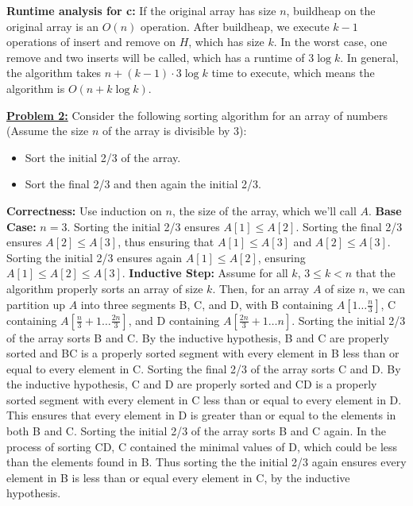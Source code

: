 \documentclass[11pt]{article}
\begin{document}
\begin{flushleft}
		\textbf{Runtime analysis for c:} If the original array has size $n$, buildheap on the original array is an $O(n)$ operation. After buildheap, we execute $k - 1$ operations of insert and remove on $H$, which has size $k$. In the worst case, one remove and two inserts will be called, which has a runtime of $3 \log k$. In general, the algorithm takes $n + (k - 1) \cdot 3 \log k$ time to execute, which means the algorithm is $O(n + k \log k)$.
		\newline
		\item \textbf {\underline{Problem 2:}} Consider the following sorting algorithm for an array of numbers (Assume the size $n$ of the array is divisible by 3):
		\begin{itemize}
			\item   Sort the initial 2/3 of the array.
			\item   Sort the final 2/3 and then again the initial 2/3.
		\end{itemize}
		\textbf{Correctness:} Use induction on $n$, the size of the array, which we'll call $A$. 
		\newline
		\textbf{Base Case:} $n = 3$. Sorting the initial 2/3 ensures $A[1] \leq A[2]$. Sorting the final 2/3 ensures $A[2] \leq A[3]$, thus ensuring that $A[1] \leq A[3]$ and $A[2] \leq A[3]$. Sorting the initial 2/3 ensures again $A[1] \leq A[2]$, ensuring $A[1] \leq A[2] \leq A[3]$.  
		\newline
		\textbf{Inductive Step:} Assume for all $k$, $3 \leq k < n$ that the algorithm properly sorts an array of size $k$. Then, for an array $A$ of size $n$, we can partition up $A$ into three segments B, C, and D, with B containing 
		$A[1 \dots \frac{n}{3}]$, C containing $A[\frac{n}{3} + 1 \dots \frac{2n}{3}]$, and D containing $A[\frac{2n}{3} + 1 \dots n]$. 
		\newline
		Sorting the initial 2/3 of the array sorts B and C. By the inductive hypothesis, B and C are properly sorted and BC is a properly sorted segment with every element in B less than or equal to every element in C.
		\newline
		Sorting the final 2/3 of the array sorts C and D. By the inductive hypothesis, C and D are properly sorted and CD is a properly sorted segment with every element in C less than or equal to every element in D. This ensures that every element in D is greater than or equal to the elements in both B and C. 
		\newline
		Sorting the initial 2/3 of the array sorts B and C again. In the process of sorting CD, C contained the minimal values of D, which could be less than the elements found in B. Thus sorting the the initial 2/3 again ensures every element in B is less than or equal every element in C, by the inductive hypothesis.

\end{flushleft}
\end{document}
